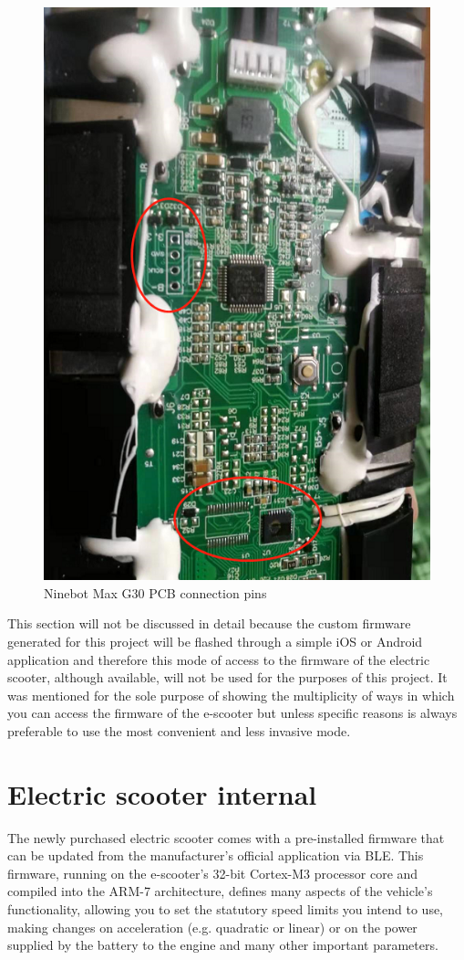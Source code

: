 \documentclass[binding=0.6cm,LaM,noexaminfo]{sapthesis}
\begin{document}
\begin{figure}[!htp]
    \centering
    \includegraphics[width = .5\textwidth]{images/unknown-2.png}
    \caption{Ninebot Max G30 PCB connection pins}
    \label{fig:conn_pins}
\end{figure}

\noindent This section will not be discussed in detail because the custom firmware generated for this project will be flashed through a simple iOS or Android application and therefore this mode of access to the firmware of the electric scooter, although available, will not be used for the purposes of this project. It was mentioned for the sole purpose of showing the multiplicity of ways in which you can access the firmware of the e-scooter but unless specific reasons is always preferable to use the most convenient and less invasive mode.


\chapter{Electric scooter internal}
The newly purchased electric scooter comes with a pre-installed firmware that can be updated from the manufacturer's official application via BLE. This firmware, running on the e-scooter's 32-bit Cortex-M3 processor core and compiled into the ARM-7 architecture, defines many aspects of the vehicle's functionality, allowing you to set the statutory speed limits you intend to use, making changes on acceleration (e.g. quadratic or linear) or on the power supplied by the battery to the engine and many other important parameters.
\end{document}
